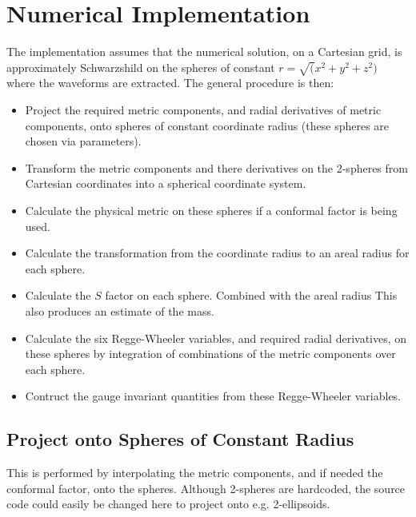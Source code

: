 \documentclass{article}
\begin{document}
\section{Numerical Implementation}

The implementation assumes that the numerical solution, on a Cartesian
grid, is approximately Schwarzshild on the spheres of constant
$r=\sqrt(x^2+y^2+z^2)$ where the waveforms are extracted. The general
procedure is then:

\begin{itemize}

  \item Project the required metric components, and radial derivatives
  of metric components, onto spheres of constant coordinate radius
  (these spheres are chosen via parameters).

  \item Transform the metric components and there derivatives on the
  2-spheres from Cartesian coordinates into a spherical coordinate
  system.

  \item Calculate the physical metric on these spheres if a conformal
  factor is being used.

  \item Calculate the transformation from the coordinate radius to an
  areal radius for each sphere.

  \item Calculate the $S$ factor on each sphere. Combined with the
  areal radius This also produces an estimate of the mass.

  \item Calculate the six Regge-Wheeler variables, and required radial
  derivatives, on these spheres by integration of combinations of the
  metric components over each sphere.

  \item Contruct the gauge invariant quantities from these
  Regge-Wheeler variables.

\end{itemize}

\subsection{Project onto Spheres of Constant Radius}

This is performed by interpolating the metric components, and if
needed the conformal factor, onto the spheres. Although 2-spheres are
hardcoded, the source code could easily be changed here to project
onto e.g. 2-ellipsoids.
\end{document}
